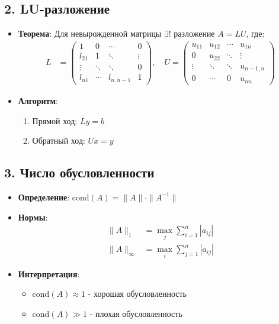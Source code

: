 \documentclass[12pt, a4paper]{article}
\begin{document}
\subsection*{2. LU-разложение}
\begin{itemize}
\item \textbf{Теорема}: Для невырожденной матрицы $\exists!$ разложение $A = LU$, где:
\begin{align*}
L &= \begin{pmatrix}
1 & 0 & \cdots & 0 \\
l_{21} & 1 & \ddots & \vdots \\
\vdots & \ddots & \ddots & 0 \\
l_{n1} & \cdots & l_{n,n-1} & 1
\end{pmatrix}, \quad
U = \begin{pmatrix}
u_{11} & u_{12} & \cdots & u_{1n} \\
0 & u_{22} & \ddots & \vdots \\
\vdots & \ddots & \ddots & u_{n-1,n} \\
0 & \cdots & 0 & u_{nn}
\end{pmatrix}
\end{align*}
\item \textbf{Алгоритм}:
\begin{enumerate}
\item Прямой ход: $Ly = b$
\item Обратный ход: $Ux = y$
\end{enumerate}
\end{itemize}

\subsection*{3. Число обусловленности}
\begin{itemize}
\item \textbf{Определение}: $\text{cond}(A) = \|A\| \cdot \|A^{-1}\|$
\item \textbf{Нормы}:
\begin{align*}
\|A\|_1 &= \max_j \sum_{i=1}^n |a_{ij}| \\
\|A\|_\infty &= \max_i \sum_{j=1}^n |a_{ij}|
\end{align*}
\item \textbf{Интерпретация}:
\begin{itemize}
\item $\text{cond}(A) \approx 1$ - хорошая обусловленность
\item $\text{cond}(A) \gg 1$ - плохая обусловленность
\end{itemize}
\end{itemize}
\end{document}
